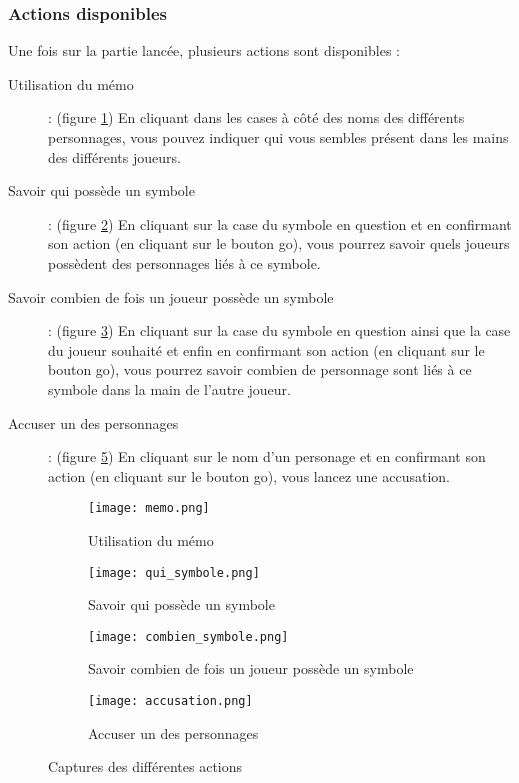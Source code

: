 \subsubsection{Actions disponibles}

Une fois sur la partie lancée, plusieurs actions sont disponibles :
\begin{description}
  \item[Utilisation du mémo] : (figure \ref{fig:memo}) En cliquant dans les cases à côté des noms des différents personnages, vous pouvez indiquer qui vous sembles présent dans les mains des différents joueurs.
  \item[Savoir qui possède un symbole] : (figure \ref{fig:qui_symbole}) En cliquant sur la case du symbole en question et en confirmant son action (en cliquant sur le bouton go), vous pourrez savoir quels joueurs possèdent des personnages liés à ce symbole.
  \item[Savoir combien de fois un joueur possède un symbole] : (figure \ref{fig:combien_symbole}) En cliquant sur la case du symbole en question ainsi que la case du joueur souhaité et enfin en confirmant son action (en cliquant sur le bouton go), vous pourrez savoir combien de personnage sont liés à ce symbole dans la main de l'autre joueur.
  \item[Accuser un des personnages] : (figure \ref{fig:accusation}) En cliquant sur le nom d'un personage et en confirmant son action (en cliquant sur le bouton go), vous lancez une accusation.
\end{description}

\begin{figure}[H]
     \centering
     \begin{subfigure}{.45\linewidth}
       \centering
           \texttt{[image: memo.png]}
       \caption{Utilisation du mémo}
       \label{fig:memo}
     \end{subfigure}
     \hspace{1em}
     \begin{subfigure}{.45\linewidth}
	  \centering
       \texttt{[image: qui\_symbole.png]}
       \caption{Savoir qui possède un symbole}
       \label{fig:qui_symbole}
     \end{subfigure}
     \hspace{1em}
     \begin{subfigure}{.45\linewidth}
         \centering
         \texttt{[image: combien\_symbole.png]}
        \caption{Savoir combien de fois un joueur possède un symbole}
       \label{fig:combien_symbole}
     \end{subfigure}
     \hspace{1em}
     \begin{subfigure}{.45\linewidth}
	 \centering
           \texttt{[image: accusation.png]}
      	   \caption{Accuser un des personnages}
       \label{fig:accusation}
     \end{subfigure}
     \caption{Captures des différentes actions}
\end{figure}

